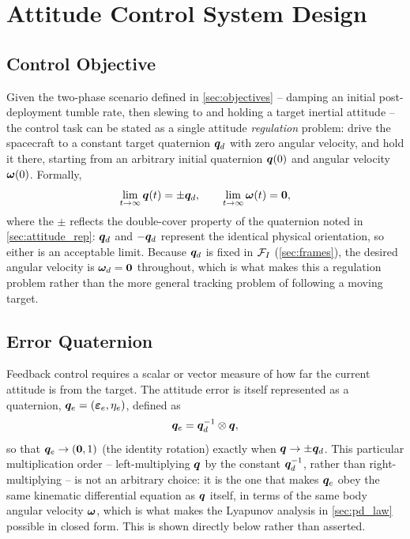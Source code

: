 \section{Attitude Control System Design}
\label{sec:control}

\subsection{Control Objective}
\label{sec:control_objective}

Given the two-phase scenario defined in \cref{sec:objectives} -- damping an initial post-deployment tumble rate, then slewing to and holding a target inertial attitude -- the control task can be stated as a single attitude \emph{regulation} problem: drive the spacecraft to a constant target quaternion $\bm{q}_d$ with zero angular velocity, and hold it there, starting from an arbitrary initial quaternion $\bm{q}(0)$ and angular velocity $\bm{\omega}(0)$. Formally,
\begin{equation}
    \lim_{t\to\infty}\bm{q}(t) = \pm\bm{q}_d, \qquad \lim_{t\to\infty}\bm{\omega}(t) = \bm{0},
    \label{eq:control_objective}
\end{equation}
where the $\pm$ reflects the double-cover property of the quaternion noted in \cref{sec:attitude_rep}: $\bm{q}_d$ and $-\bm{q}_d$ represent the identical physical orientation, so either is an acceptable limit. Because $\bm{q}_d$ is fixed in $\mathcal{F}_I$ (\cref{sec:frames}), the desired angular velocity is $\bm{\omega}_d = \bm{0}$ throughout, which is what makes this a regulation problem rather than the more general tracking problem of following a moving target.

\subsection{Error Quaternion}
\label{sec:error_quat}

Feedback control requires a scalar or vector measure of how far the current attitude is from the target. The attitude error is itself represented as a quaternion, $\bm{q}_{e} = (\bm{\varepsilon}_e, \eta_e)$, defined as
\begin{equation}
    \bm{q}_{e} = \bm{q}_d^{-1}\otimes\bm{q},
    \label{eq:error_quat_def}
\end{equation}
so that $\bm{q}_{e}\to(\bm{0},1)$ (the identity rotation) exactly when $\bm{q}\to\pm\bm{q}_d$. This particular multiplication order -- left-multiplying $\bm{q}$ by the constant $\bm{q}_d^{-1}$, rather than right-multiplying -- is not an arbitrary choice: it is the one that makes $\bm{q}_{e}$ obey the same kinematic differential equation as $\bm{q}$ itself, in terms of the same body angular velocity $\bm{\omega}$, which is what makes the Lyapunov analysis in \cref{sec:pd_law} possible in closed form. This is shown directly below rather than asserted.


